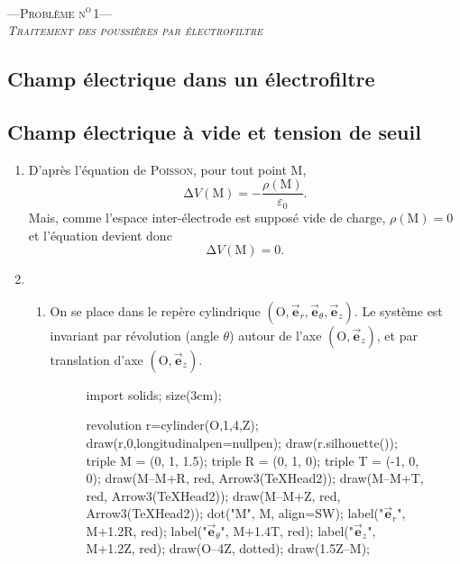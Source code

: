 \documentclass[a4paper, 10pt]{article}
\makeatletter
\let\@vec\vec
\renewcommand{\vec}[1]{\ensuremath{\@vec{\mathbf{#1}}}}
\makeatother
\begin{document}
	\begin{center}
		\LARGE\scshape ---\quad Problème n\textsuperscript o\,1\quad--- \\
		\itshape Traitement des poussières par électrofiltre
	\end{center}

	\begin{multicols}{2}
		\section{Champ électrique dans un électrofiltre}
		\subsection{Champ électrique à vide et tension de seuil}
		\begin{enumerate}
			\item D'après l'équation de \textsc{Poisson}, pour tout point $\mathrm{M}$, \[
					\mathrm{\Delta}V(\mathrm{M}) = - \frac{\rho(\mathrm{M})}{\varepsilon_0}
				.\]Mais, comme l'espace inter-électrode est supposé vide de charge, $\rho(\mathrm{M}) = 0$\/ et l'équation devient donc \[
					\boxed{\mathrm{\Delta}V(\mathrm{M}) = 0.}
				\]
			\item
				\begin{enumerate}
					\item On se place dans le repère cylindrique $(\mathrm{O}, \vec{e}_r, \vec{e}_\theta, \vec{e}_z)$.
						Le système est invariant par révolution (angle $\theta$) autour de l'axe $(\mathrm{O},\vec{e}_z)$, et par translation d'axe $(\mathrm{O},\vec{e}_z)$.
						\begin{figure}[H]
							\centering
							\begin{asy}
								import solids;
								size(3cm);

								revolution r=cylinder(O,1,4,Z);
								draw(r,0,longitudinalpen=nullpen);
								draw(r.silhouette());
								triple M = (0, 1, 1.5);
								triple R = (0, 1, 0);
								triple T = (-1, 0, 0);
								draw(M--M+R, red, Arrow3(TeXHead2));
								draw(M--M+T, red, Arrow3(TeXHead2));
								draw(M--M+Z, red, Arrow3(TeXHead2));
								dot("$\mathrm{M}$", M, align=SW);
								label("$\vec e_r$", M+1.2R, red);
								label("$\vec e_\theta$", M+1.4T, red);
								label("$\vec e_z$", M+1.2Z, red);
								draw(O--4Z, dotted);
								draw(1.5Z--M);


\end{asy}
\end{figure}
\end{enumerate}
\end{enumerate}
\end{multicols}
\end{document}
